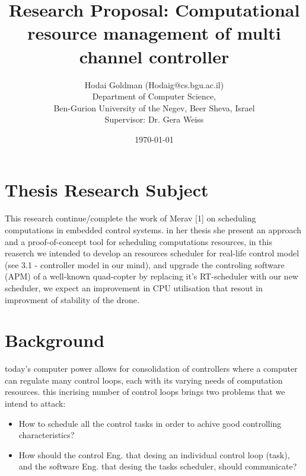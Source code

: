 \documentclass[11pt]{article}
\author{Hodai Goldman (Hodaig@cs.bgu.ac.il) \\
Department of Computer Science, \\
Ben-Gurion University of the Negev, Beer Sheva, Israel \\
Supervisor: Dr. Gera Weiss}
\date{\today}
\title{Research Proposal: Computational resource management of multi channel controller}
\begin{document}
\begin{titlepage}
\maketitle
\end{titlepage}




\section{Thesis Research Subject}
This research continue/complete the work of Merav [1] on scheduling computations in embedded control systems.
in her thesis she present an approach and a proof-of-concept tool for scheduling computations resources,
in this reaserch we intended to develop an resources scheduler for real-life control model (see 3.1 - controller model in our mind),
and upgrade the controling software (APM) of a well-known quad-copter by replacing it's RT-scheduler with our new scheduler,
we expect an improvement in CPU utilisation that resout in improvment of stability of the drone.


\section{Background}
today’s computer power allows for consolidation of controllers where a computer can regulate many control loops,
each with its varying needs of computation resources.
this incrising number of control loops brings two problems that we intend to attack:
\begin{itemize}
\item How to schedule all the control tasks in order to achive good controlling characteristics?
\item How should the control Eng. that desing an individual control loop (task), and the software Eng. that desing the tasks scheduler, should communicate?
\end{itemize}
\end{document}
